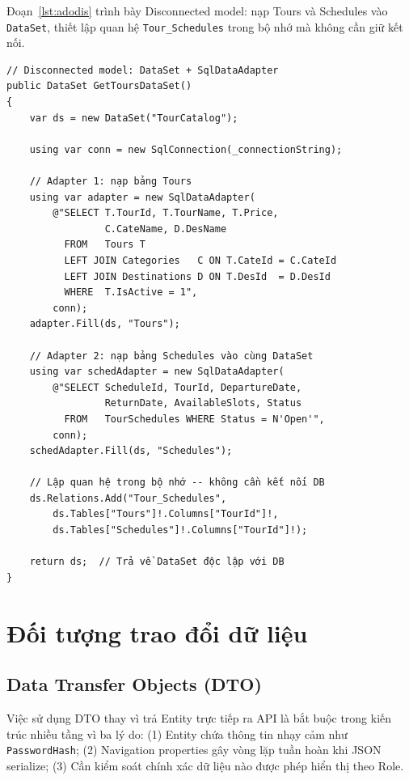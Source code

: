 Đoạn~\ref{lst:adodis} trình bày Disconnected model: nạp Tours
và Schedules vào \texttt{DataSet}, thiết lập quan hệ
\texttt{Tour\_Schedules} trong bộ nhớ mà không cần giữ kết nối.

\begin{lstlisting}[style=csharp,
  caption={ADO.NET Disconnected Model -- DataSet + DataRelation},
  label={lst:adodis}]
// Disconnected model: DataSet + SqlDataAdapter
public DataSet GetToursDataSet()
{
    var ds = new DataSet("TourCatalog");

    using var conn = new SqlConnection(_connectionString);

    // Adapter 1: nạp bảng Tours
    using var adapter = new SqlDataAdapter(
        @"SELECT T.TourId, T.TourName, T.Price,
                 C.CateName, D.DesName
          FROM   Tours T
          LEFT JOIN Categories   C ON T.CateId = C.CateId
          LEFT JOIN Destinations D ON T.DesId  = D.DesId
          WHERE  T.IsActive = 1",
        conn);
    adapter.Fill(ds, "Tours");

    // Adapter 2: nạp bảng Schedules vào cùng DataSet
    using var schedAdapter = new SqlDataAdapter(
        @"SELECT ScheduleId, TourId, DepartureDate,
                 ReturnDate, AvailableSlots, Status
          FROM   TourSchedules WHERE Status = N'Open'",
        conn);
    schedAdapter.Fill(ds, "Schedules");

    // Lập quan hệ trong bộ nhớ -- không cần kết nối DB
    ds.Relations.Add("Tour_Schedules",
        ds.Tables["Tours"]!.Columns["TourId"]!,
        ds.Tables["Schedules"]!.Columns["TourId"]!);

    return ds;  // Trả về DataSet độc lập với DB
}
\end{lstlisting}

\section{Đối tượng trao đổi dữ liệu}\label{Sec3.5}

\subsection{Data Transfer Objects (DTO)}\label{sub3.5.1}

\begin{thm}\label{thm3.4}
Việc sử dụng DTO thay vì trả Entity trực tiếp ra API là bắt
buộc trong kiến trúc nhiều tầng vì ba lý do: (1) Entity chứa
thông tin nhạy cảm như \texttt{PasswordHash}; (2) Navigation
properties gây vòng lặp tuần hoàn khi JSON serialize; (3) Cần
kiểm soát chính xác dữ liệu nào được phép hiển thị theo Role.
\end{thm}

